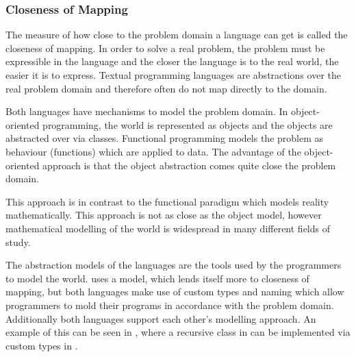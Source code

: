 \subsubsection{Closeness of Mapping}
The measure of how close to the problem domain a language can get is called the closeness of mapping. In order to solve a real problem, the problem must be expressible in the language and the closer the language is to the real world, the easier it is to express\cite{green1996usability}. Textual programming languages are abstractions over the real problem domain and therefore often do not map directly to the domain.

Both languages have mechanisms to model the problem domain. In object-oriented programming, the world is represented as objects and the objects are abstracted over via classes\cite{kindler2011object}. Functional programming models the problem as behaviour (functions) which are applied to data\cite{hughes1989functional}. The advantage of the object-oriented approach is that the object abstraction comes quite close the problem domain.


This approach is in contrast to the functional paradigm which models reality mathematically. This approach is not as close as the object model, however mathematical modelling of the world is widespread in many different fields of study.


The abstraction models of the languages are the tools used by the programmers to model the world. \cs uses a model, which lends itself more to closeness of mapping, but both languages make use of custom types and naming which allow programmers to mold their programs in accordance with the problem domain. Additionally both languages support each other's modelling approach. An example of this can be seen in , where a recursive class in \cs can be implemented via custom types in \fs.

